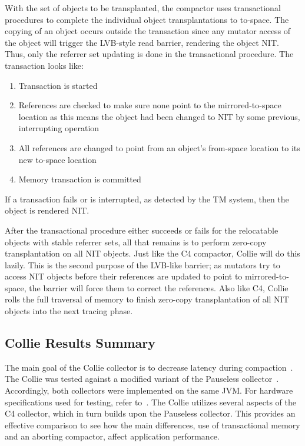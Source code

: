 \documentclass{sig-alternate}
\begin{document}
With the set of objects to be transplanted, the compactor uses transactional
procedures to complete the individual object transplantations to to-space.
The copying of an object occurs outside the transaction since any
mutator access of the object will trigger the LVB-style read barrier,
rendering the object NIT. Thus, only the referrer set updating
is done in the transactional procedure. The transaction looks like:
\begin{enumerate}
\item Transaction is started
\item References are checked to make sure none point to the mirrored-to-space location as this means the object had been changed to NIT by some previous, interrupting operation
\item All references are changed to point from an object's from-space location to its new to-space location
\item Memory transaction is committed
\end{enumerate}
If a transaction fails or is interrupted, as detected by the TM system, then the object is rendered NIT.

After the transactional procedure either succeeds or fails for the 
relocatable objects with stable referrer sets, all that remains is to perform zero-copy transplantation
on all NIT objects. Just like the C4 compactor, Collie will do this lazily. This is the second purpose
of the LVB-like barrier; as mutators try to access NIT objects before their references are updated to
point to mirrored-to-space, the barrier will force them to correct the references. Also like C4, Collie
rolls the full traversal of memory to finish zero-copy transplantation of all NIT objects into the next
tracing phase.


\subsection{Collie Results Summary}
\label{sec:collieResults}

The main goal of the Collie collector is to decrease latency
during compaction~\cite{Iyengar:Collie}. The Collie was tested 
against a modified variant of the Pauseless collector~\cite{Click:Pauseless}.
Accordingly, both collectors were implemented on the same JVM. For hardware
specifications used for testing, refer to~\cite{Iyengar:Collie}. The Collie
utilizes several aspects of the C4 collector, which in turn builds upon the Pauseless
collector. This provides an effective comparison to see how the main differences, 
use of transactional memory and an aborting compactor, affect application performance. 
\end{document}
